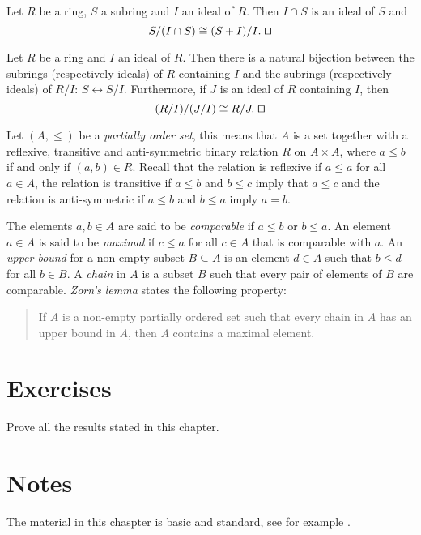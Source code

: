 \begin{theorem}
	Let $R$ be a ring,  $S$ a subring and $I$ an ideal of $R$. Then $I\cap S$ is an ideal of $S$ and
	$$S/(I\cap S)\cong (S+I)/I. \; \qed$$  
\end{theorem}

\begin{theorem} Let $R$ be a ring and $I$ an ideal of $R$. Then there is a natural bijection between the subrings (respectively ideals) of $R$ containing $I$ and the subrings (respectively ideals) of $R/I$: $S\leftrightarrow S/I$. Furthermore, if $J$ is an ideal of $R$ containing $I$, then
	$$(R/I)/(J/I)\cong R/J.\; \qed$$ 
\end{theorem}

Let $(A,\leq)$ be a {\em partially order set}, this means that $A$ is a set together with a 
reflexive, transitive and anti-symmetric binary relation
$R$ on $A\times A$, where $a\leq b$ if and only if $(a,b)\in R$. 
Recall that the relation is reflexive if $a\leq a$ for all $a\in A$, the relation is transitive if 
$a\leq b$ and $b\leq c$ imply that 
$a\leq c$ and the relation is anti-symmetric if $a\leq b$ and $b\leq a$ imply $a=b$.

The elements $a,b\in A$ are said to be {\em comparable} if $a\leq b$ or $b\leq
a$. An element $a\in A$ is said to be {\em maximal} if 
$c\leq a$ 
for all $c\in A$
that is comparable with $a$. 
An {\em upper bound} for a non-empty subset $B\subseteq A$ is an element $d\in
A$ such that $b\leq d$ for all $b\in B$. A {\em chain} in $A$ is a subset 
$B$ such that every pair of elements of $B$ are comparable. 
{\em Zorn's lemma} states the following property: 
\begin{quote}
	If $A$ is a non-empty partially ordered set such that every chain in 
	$A$ has an upper bound in $A$, then $A$ contains a maximal element. 
\end{quote}


\section*{Exercises}

\begin{prob} Prove all the results stated in this chapter.
\end{prob}



\section*{Notes}
The material in this chaspter is basic and standard, see for example \cite{Cohn}.
